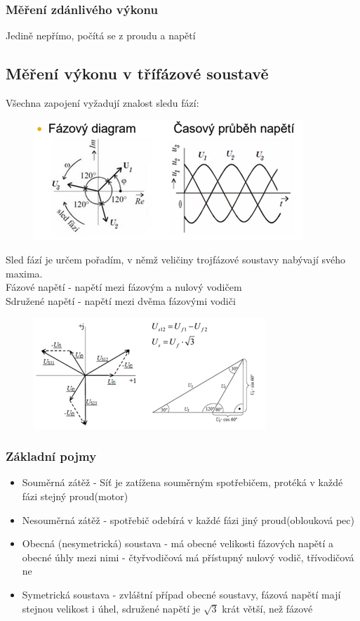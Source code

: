 \subsubsection*{Měření zdánlivého výkonu}
Jedině nepřímo, počítá se z proudu a napětí


\subsection*{Měření výkonu v třífázové soustavě}
Všechna zapojení vyžadují znalost sledu fází:
\begin{figure}[H]
    \includegraphics*[scale = 1.2]{images/fazovyDiagram.png}
\end{figure}
Sled fází je určem pořadím, v němž veličiny trojfázové soustavy nabývají svého maxima.\\

Fázové napětí - napětí mezi fázovým a nulový vodičem\\
Sdružené napětí - napětí mezi dvěma fázovými vodiči
\begin{figure}[H]
    \includegraphics*[scale = 1.2]{images/sdruzeneNapeti.png}
\end{figure}

\subsubsection*{Základní pojmy}
\begin{itemize}
    \item Souměrná zátěž - Síť je zatížena souměrným spotřebičem, protéká v každé fázi stejný proud(motor)
    \item Nesouměrná zátěž - spotřebič odebírá v každé fázi jiný proud(oblouková pec)
    \item Obecná (nesymetrická) soustava - má obecné velikosti fázových napětí a obecné úhly mezi nimi - čtyřvodičová má přístupný nulový vodič, třívodičová ne
    \item Symetrická soustava - zvláštní případ obecné soustavy, fázová napětí mají stejnou velikost i úhel, sdružené napětí je $\sqrt{3}$ krát větší, než fázové
\end{itemize}

